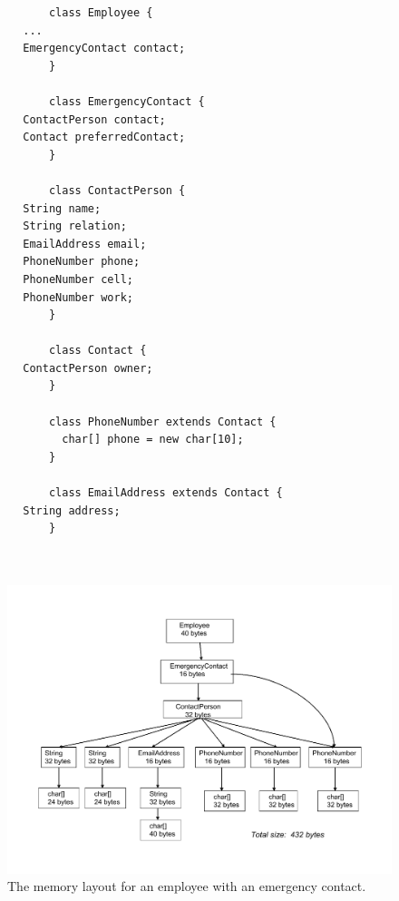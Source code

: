\ttfamily
\begin{verbatim} 
			class Employee {
        ...
        EmergencyContact contact;
			}
			
			class EmergencyContact {
        ContactPerson contact;
        Contact preferredContact;
			}
			
			class ContactPerson {
        String name;
        String relation;
        EmailAddress email;
        PhoneNumber phone;
        PhoneNumber cell;
        PhoneNumber work;
			}
			
			class Contact {
        ContactPerson owner;
			}
			
			class PhoneNumber extends Contact {
			  char[] phone = new char[10];
			}
			
			class EmailAddress extends Contact {
        String address;
			}
			
			
\end{verbatim}
\normalfont
 \begin{figure}
  \centering
 \includegraphics[width=.70\textwidth]{Figures/chapter4/employee-status-fine-grained.pdf}
  \caption{The memory layout for an employee with an emergency contact.}
  \label{fig:employee-status-fine-grained}
\end{figure}

